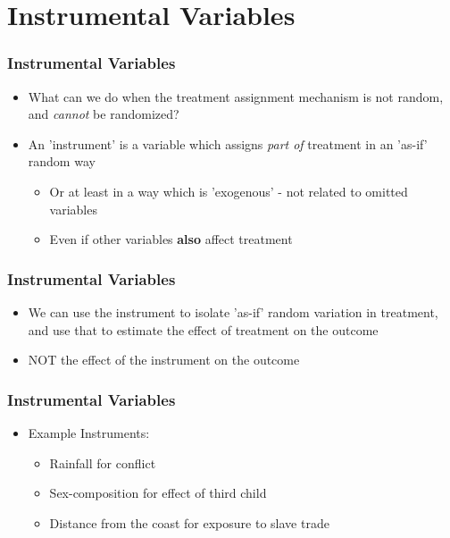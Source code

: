 \documentclass[xcolor=x11names,compress]{beamer}\usepackage[]{graphicx}\usepackage[]{xcolor}
\renewcommand{\(}{\begin{columns}}
\renewcommand{\)}{\end{columns}}
\newcommand{\<}[1]{\begin{column}{#1}}
\renewcommand{\>}{\end{column}}
\begin{document}
\section{Instrumental Variables}

\begin{frame}
\frametitle{Instrumental Variables}
\begin{itemize}
\item What can we do when the treatment assignment mechanism is not random, and \textit{cannot} be randomized?
\pause
\item An 'instrument' is a variable which assigns \textit{part of} treatment in an 'as-if' random way
\pause
\begin{itemize}
\item Or at least in a way which is 'exogenous' - not related to omitted variables
\item Even if other variables \textbf{also} affect treatment
\end{itemize}
\end{itemize}
\end{frame}

\begin{frame}
\frametitle{Instrumental Variables}
\begin{itemize}
\item We can use the instrument to isolate 'as-if' random variation in treatment, and use that to estimate the effect of treatment on the outcome
\pause
\item NOT the effect of the instrument on the outcome
\end{itemize}
\end{frame}

\begin{frame}
\frametitle{Instrumental Variables}
\begin{itemize}
\item Example Instruments:
\begin{itemize}
\item Rainfall for conflict 
\item Sex-composition for effect of third child
\item Distance from the coast for exposure to slave trade
\end{itemize}
\end{itemize}
\end{frame}
\end{document}
